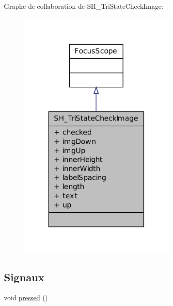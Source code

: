 Graphe de collaboration de S\-H\-\_\-\-Tri\-State\-Check\-Image\-:
\nopagebreak
\begin{figure}[H]
\begin{center}
\leavevmode
\includegraphics[width=226pt]{classSH__TriStateCheckImage__coll__graph}
\end{center}
\end{figure}
\subsection*{Signaux}
\begin{DoxyCompactItemize}
\item 
void \hyperlink{classSH__TriStateCheckImage_aad96452a92df7b35ed1cec9eebf6d2ba}{pressed} ()
\end{DoxyCompactItemize}
